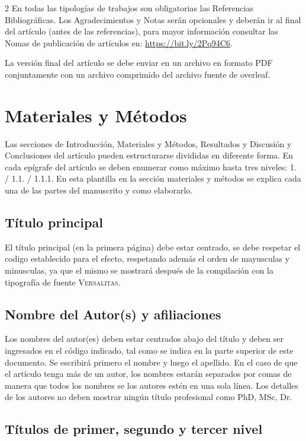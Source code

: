 \documentclass[12pt,twoside,titlepage]{ingenius}
\begin{document}
\begin{multicols}{2}
En todas las tipologías de trabajos son obligatorias las Referencias Bibliográficas. Los Agradecimientos y Notas serán opcionales y deberán ir al final del artículo (antes de las referencias), para mayor información consultar las Nomas de publicación de artículos en: \url{https://bit.ly/2Pq94C6}.

La versión final del artículo se debe enviar en un archivo en formato PDF conjuntamente con un archivo comprimido del archivo fuente de overleaf.

\section{Materiales y Métodos}

Las secciones de Introducción, Materiales y Métodos, Resultados y Discusión y Conclusiones del artículo pueden estructurarse divididas en diferente forma. En cada epígrafe del artículo se deben enumerar como máximo hasta tres niveles: 1. / 1.1. / 1.1.1. En esta plantilla en la sección materiales y métodos se explica cada una de las partes del manuscrito y como elaborarlo.

\subsection{Título principal}

El título principal (en la primera página) debe estar centrado, se debe respetar el codigo establecido para el efecto, respetando además el orden de mayusculas y minusculas, ya que el mismo se mostrará después de la compilación con la tipografía de fuente \textsc{Versalitas}.

\subsection{Nombre del Autor(s) y afiliaciones}

Los nombres del autor(es) deben estar centrados abajo del título y deben ser ingresados en el código indicado, tal como se indica en la parte superior de este documento.
      Se escribirá primero el nombre y luego el apellido. En el caso de que el artículo tenga más de un autor, los nombres estarán separados por comas de manera que todos los nombres se los autores estén en una sola línea. Los detalles de los autores no deben mostrar ningún título profesional como PhD, MSc, Dr.

\subsection{Títulos de primer, segundo y tercer nivel}


\end{multicols}
\end{document}
